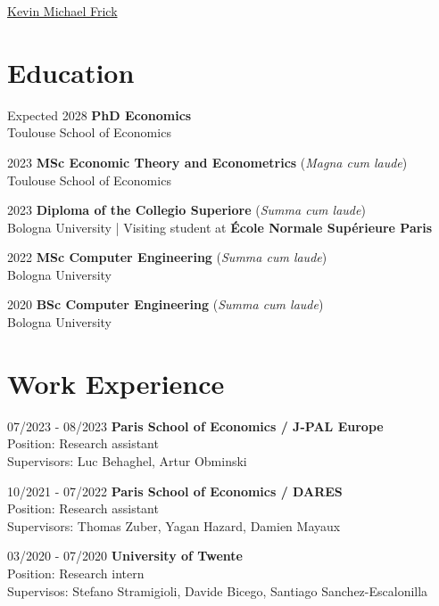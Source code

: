 \documentclass[11pt,a4paper]{article}
\newcommand{\longunderline}[1]{\uline{#1\hfill\mbox{}}}
\begin{document}
\date{}
\thispagestyle{empty}
\setlength\cvlabelwidth{90pt}

\begin{cv}
{\huge \longunderline{Kevin Michael Frick}}
\section*{Education}
\begin{cvlist}{}
  \itemsep -5pt

	\item[Expected 2028]
		\textbf{PhD Economics}\\
    Toulouse School of Economics
  \item[2023]
    \textbf{MSc Economic Theory and Econometrics} (\emph{Magna cum laude})\\
    Toulouse School of Economics
  \item[2023]
    \textbf{Diploma of the Collegio Superiore} (\emph{Summa cum laude})\\
    Bologna University  |  Visiting student at \textbf{École Normale Supérieure Paris}
  \item[2022]
    \textbf{MSc Computer Engineering} (\emph{Summa cum laude})\\
    Bologna University
  \item[2020]
    \textbf{BSc Computer Engineering} (\emph{Summa cum laude})\\
    Bologna University
\end{cvlist}
\vspace{-24pt}
\section*{Work Experience}
\begin{cvlist}{}
  \itemsep -5pt
	\item[07/2023 - 08/2023]
		\textbf{Paris School of Economics / J-PAL Europe}\\
		Position: Research assistant\\
		Supervisors: Luc Behaghel, Artur Obminski
	\item[10/2021 - 07/2022]
    \textbf{Paris School of Economics / DARES}\\
		Position: Research assistant\\
		Supervisors: Thomas Zuber, Yagan Hazard, Damien Mayaux
	\item[03/2020 - 07/2020]
		\textbf{University of Twente}\\
		Position: Research intern\\
		Supervisos: Stefano Stramigioli, Davide Bicego, Santiago Sanchez-Escalonilla
\end{cvlist}
\vspace{-24pt}

\end{cv}
\end{document}
